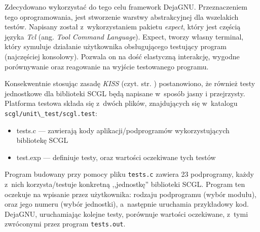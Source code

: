 \documentclass[a4paper,12pt,polish,twoside,openright]{thesis}
\newcommand\code[1]{\lstinline[style=line]{#1}}
\begin{document}
Zdecydowano wykorzystać do tego celu framework DejaGNU.
Przeznaczeniem tego oprogramowania, jest stworzenie warstwy abstrakcyjnej dla wszelakich testów\cite{dejagnu}.
Napisany został z~wykorzystaniem pakietu \emph{expect}, który jest częścią języka \emph{Tcl} (ang. \emph{Tool Command Language}).
Expect, tworzy własny terminal, który symuluje działanie użytkownika obsługującego testujący program (najczęściej konsolowy)\cite{expect}.
Pozwala on na dość elastyczną interakcję, wygodne porównywanie oraz reagowanie na wyjście testowanego programu.

Konsekwentnie stosując zasadę \emph{KISS} (czyt. str. \pageref{kiss}) postanowiono, że również testy jednostkowe dla biblioteki SCGL będą napisane w~sposób jasny i przejrzysty.
Platforma testowa składa się z~dwóch plików, znajdujących się w~katalogu \code{scgl/unit\_test/scgl.test}:
\begin{itemize}
	\item tests.c --- zawierają kody aplikacji/podprogramów wykorzystujących bibliotekę SCGL
	\item test.exp --- definiuje testy, oraz wartości oczekiwane tych testów
\end{itemize}
Program budowany przy pomocy pliku \code{tests.c} zawiera 23 podprogramy, każdy z~nich korzysta/testuje konkretną ,,jednostkę'' biblioteki SCGL.
Program ten oczekuje na wpisanie przez użytkownika: rodzaju podprogramu (wybór modułu), oraz jego numeru (wybór jednostki), a~następnie uruchamia przykładowy kod.
DejaGNU, uruchamiając kolejne testy, porównuje wartości oczekiwane, z~tymi zwróconymi przez program \code{tests.out}.
\end{document}
